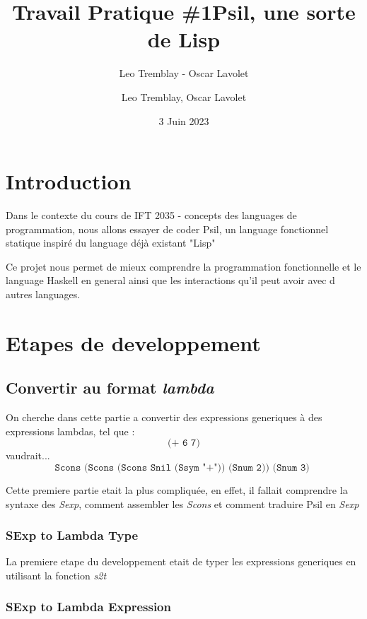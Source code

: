 \documentclass{article}
\title{Travail Pratique \#1}
\author{Leo Tremblay - Oscar Lavolet}
\title{Psil, une sorte de Lisp}
\author{Leo Tremblay, Oscar Lavolet}
\date{ 3 Juin 2023}
\begin{document}
\maketitle

\section{Introduction}

Dans le contexte du cours de IFT 2035 - concepts des languages de programmation, nous allons essayer de coder Psil, un language fonctionnel statique inspiré du language déjà existant "Lisp"

Ce projet nous permet de mieux comprendre la programmation fonctionnelle et le language Haskell en general ainsi que les interactions qu'il peut avoir avec d autres languages.


\section{Etapes de developpement}

\subsection{Convertir au format \emph{lambda} }

On cherche dans cette partie a convertir des expressions generiques à des expressions lambdas, tel que :
\begin{displaymath}
    \texttt{(+ 6 7)}
\end{displaymath}
vaudrait...
\begin{displaymath}
    \texttt{Scons (Scons (Scons Snil
(Ssym "+"))
(Snum 2))
(Snum 3)
 }
\end{displaymath}

Cette premiere partie etait la plus compliquée, en effet, il fallait comprendre la syntaxe des {\slshape Sexp}, comment assembler les {\slshape Scons} et comment traduire Psil en {\slshape Sexp}

\subsubsection{ SExp to Lambda Type }
La premiere etape du developpement etait de typer les expressions generiques en utilisant la fonction {\slshape s2t} 


\subsubsection{ SExp to Lambda Expression }
\end{document}
